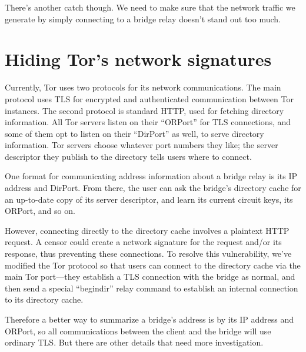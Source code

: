 \documentclass{llncs}
\begin{document}
There's another catch though. We need to make sure that the network
traffic we generate by simply connecting to a bridge relay doesn't stand
out too much.





\section{Hiding Tor's network signatures}
\label{sec:network-signature}
\label{subsec:enclave-dirs}

Currently, Tor uses two protocols for its network communications. The
main protocol uses TLS for encrypted and authenticated communication
between Tor instances. The second protocol is standard HTTP, used for
fetching directory information. All Tor servers listen on their ``ORPort''
for TLS connections, and some of them opt to listen on their ``DirPort''
as well, to serve directory information. Tor servers choose whatever port
numbers they like; the server descriptor they publish to the directory
tells users where to connect.

One format for communicating address information about a bridge relay is
its IP address and DirPort. From there, the user can ask the bridge's
directory cache for an up-to-date copy of its server descriptor, and
learn its current circuit keys, its ORPort, and so on.

However, connecting directly to the directory cache involves a plaintext
HTTP request. A censor could create a network signature for the request
and/or its response, thus preventing these connections. To resolve this
vulnerability, we've modified the Tor protocol so that users can connect
to the directory cache via the main Tor port---they establish a TLS
connection with the bridge as normal, and then send a special ``begindir''
relay command to establish an internal connection to its directory cache.

Therefore a better way to summarize a bridge's address is by its IP
address and ORPort, so all communications between the client and the
bridge will use ordinary TLS. But there are other details that need
more investigation.
\end{document}
